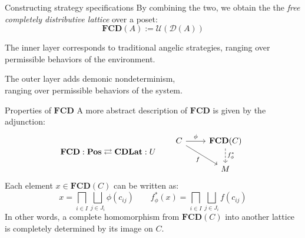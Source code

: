 \documentclass{beamer}
\begin{document}
%
%

\begin{frame}[fragile]{Constructing strategy specifications} %
By combining the two,
we obtain the
the \emph{free completely distributive lattice} over a poset:
\[
  \mathbf{FCD}(A) := \mathcal{U}(\mathcal{D}(A))
\]

The inner layer corresponds to traditional angelic strategies,
ranging over permissible behaviors of the environment.

The outer layer adds demonic nondeterminism, \\
ranging over permissible behaviors of the system.
\end{frame}

\begin{frame}[fragile]{Properties of $\mathbf{FCD}$} %
A more abstract description of $\mathbf{FCD}$
is given by the adjunction:
\[
  \mathbf{FCD} : \mathbf{Pos} \rightleftarrows \mathbf{CDLat} : U
  \qquad
  \begin{tikzcd}
    C \arrow[r, "\phi"] \arrow[rd, "f"'] &
    \mathbf{FCD}(C) \arrow[d, "f^*_\phi", dashed] \\ & M
  \end{tikzcd}
\]
Each element $x \in \mathbf{FCD}(C)$ can be written as:
\[
  x = \bigsqcap_{i \in I} \bigsqcup_{j \in J_i} \phi(c_{ij})
  \qquad
  f^*_\phi(x) = \bigsqcap_{i \in I} \bigsqcup_{j \in J_i} f(c_{ij})
\]
In other words,
a complete homomorphism from $\mathbf{FCD}(C)$ into another lattice
is completely determined by its image on $C$.
\end{frame}
\end{document}
